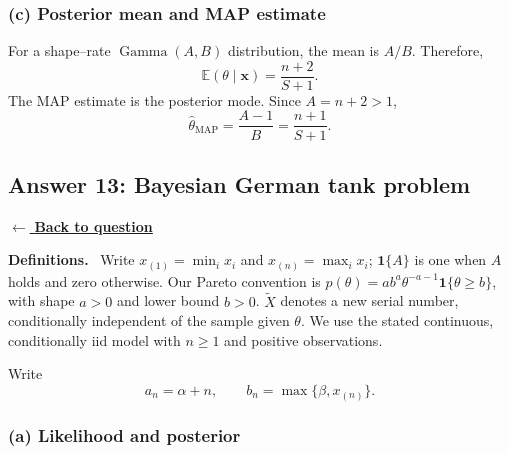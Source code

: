 \documentclass[11pt,a4paper]{article}
\newcommand{\given}{\mathrel{|}}
\newcommand{\xvec}{\boldsymbol{x}}
\newcommand{\E}{\mathbb{E}}
\newcommand{\answernav}[1]{%
  \label{answer:#1}%
  \noindent\hyperref[question:#1]{$\leftarrow$ \textbf{Back to question}}%
  \par\smallskip}
\newcommand{\studyheading}[1]{%
  \par\medskip\noindent\textcolor{statblue}{\textbf{#1.}}\ }
\begin{document}
\subsubsection*{(c) Posterior mean and MAP estimate}

For a shape--rate $\operatorname{Gamma}(A,B)$ distribution, the mean is
$A/B$. Therefore,
\[
\boxed{
\E(\theta\given\xvec)=\frac{n+2}{S+1}.
}
\]
The MAP estimate is the posterior mode. Since $A=n+2>1$,
\[
\boxed{
\widehat{\theta}_{\mathrm{MAP}}
=\frac{A-1}{B}
=\frac{n+1}{S+1}.
}
\]

\clearpage

\subsection{Answer 13: Bayesian German tank problem}
\answernav{13}

\studyheading{Definitions}
Write $x_{(1)}=\min_i x_i$ and $x_{(n)}=\max_i x_i$; $\mathbf1\{A\}$ is one when $A$ holds and zero otherwise.
Our Pareto convention is
$p(\theta)=ab^a\theta^{-a-1}\mathbf1\{\theta\ge b\}$, with shape $a>0$ and lower bound $b>0$.
$\widetilde X$ denotes a new serial number, conditionally independent of the sample given $\theta$.
We use the stated continuous, conditionally iid model with $n\ge1$ and positive observations.

Write
\[
a_n=\alpha+n,
\qquad
b_n=\max\{\beta,x_{(n)}\}.
\]

\subsubsection*{(a) Likelihood and posterior}
\end{document}

